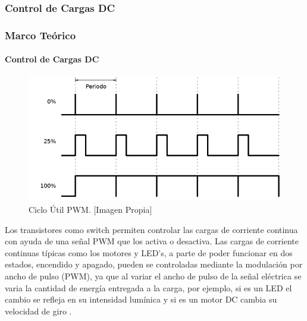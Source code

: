 \begin{frame}
\subsubsection{Control de Cargas DC}
\frametitle{Marco Teórico}
\framesubtitle{Control de Cargas DC}

\begin{figure}
	\centering
	\caption{Ciclo Útil PWM. [Imagen Propia] }
	\label{fig:pwm-duty-800x396}
	\includegraphics[width=0.9\linewidth]{Imagenes/pwm}
\end{figure}
Los transistores como switch permiten controlar las cargas de corriente continua con ayuda de una señal PWM que los activa o desactiva. Las cargas de corriente continuas típicas como los motores y LED's, a parte de poder funcionar en dos estados, encendido y apagado, pueden se controladas mediante la modulación por ancho de pulso (PWM), ya que al variar el ancho de pulso de la señal eléctrica se varia la cantidad de energía entregada a la carga, por ejemplo, si es un LED el cambio se refleja en su intensidad lumínica y si es un motor DC cambia su velocidad de giro \cite{PWM}.

\end{frame}

